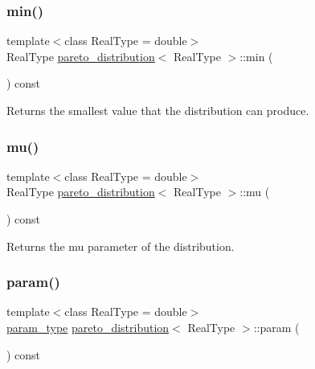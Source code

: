 \subsubsection{\texorpdfstring{min()}{min()}}
{\footnotesize\ttfamily template$<$class Real\+Type  = double$>$ \\
Real\+Type \mbox{\hyperlink{classpareto__distribution}{pareto\+\_\+distribution}}$<$ Real\+Type $>$\+::min (\begin{DoxyParamCaption}{ }\end{DoxyParamCaption}) const\hspace{0.3cm}{\ttfamily [inline]}}



Returns the smallest value that the distribution can produce. 

\mbox{\label{classpareto__distribution_ab4fd822cde4f415efa8e0bc6ce7c2bad}} 
\subsubsection{\texorpdfstring{mu()}{mu()}}
{\footnotesize\ttfamily template$<$class Real\+Type  = double$>$ \\
Real\+Type \mbox{\hyperlink{classpareto__distribution}{pareto\+\_\+distribution}}$<$ Real\+Type $>$\+::mu (\begin{DoxyParamCaption}{ }\end{DoxyParamCaption}) const\hspace{0.3cm}{\ttfamily [inline]}}



Returns the mu parameter of the distribution. 

\mbox{\label{classpareto__distribution_ae56d30e604eb00dd286f99cdf6764bda}} 
\subsubsection{\texorpdfstring{param()}{param()}\hspace{0.1cm}{\footnotesize\ttfamily [1/2]}}
{\footnotesize\ttfamily template$<$class Real\+Type  = double$>$ \\
\mbox{\hyperlink{classpareto__distribution_1_1param__type}{param\+\_\+type}} \mbox{\hyperlink{classpareto__distribution}{pareto\+\_\+distribution}}$<$ Real\+Type $>$\+::param (\begin{DoxyParamCaption}{ }\end{DoxyParamCaption}) const\hspace{0.3cm}{\ttfamily [inline]}}



